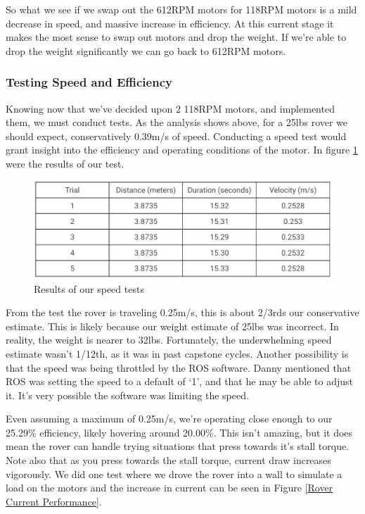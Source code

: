 \documentclass[a4paper, 10pt]{article}
\begin{document}
		So what we see if we swap out the 612RPM motors for 118RPM motors is a mild decrease in speed, and massive increase in efficiency. At this current stage it makes the most sense to swap out motors and drop the weight. If we're able to drop the weight significantly we can go back to 612RPM motors. 
		
		\subsubsection*{Testing Speed and Efficiency}
		Knowing now that we've decided upon 2 118RPM motors, and implemented them, we must conduct tests. As the analysis shows above, for a 25lbs rover we should expect, conservatively 0.39m/s of speed. Conducting a speed test would grant insight into the efficiency and operating conditions of the motor. In figure \ref{speed_test} were the results of our test.
		
		\begin{figure} [!h]
			\centering
			\includegraphics[scale=0.5]{Photos/speed_test}
			\caption{Results of our speed tests}
			\label{speed_test}
		\end{figure}
		
		From the test the rover is traveling 0.25m/s, this is about 2/3rds our conservative estimate. This is likely because our weight estimate of 25lbs was incorrect. In reality, the weight is nearer to 32lbs. Fortunately, the underwhelming speed estimate wasn't 1/12th, as it was in past capstone cycles. Another possibility is that the speed was being throttled by the ROS software. Danny mentioned that ROS was setting the speed to a default of `1', and that he may be able to adjust it. It's very possible the software was limiting the speed.
		
		Even assuming a maximum of 0.25m/s, we're operating close enough to our 25.29\% efficiency, likely hovering around 20.00\%. This isn't amazing, but it does mean the rover can handle trying situations that press towards it's stall torque. Note also that as you press towards the stall torque, current draw increases vigorously. We did one test where we drove the rover into a wall to simulate a load on the motors and the increase in current can be seen in Figure \ref{Rover Current Performance}.
	
\end{document}
